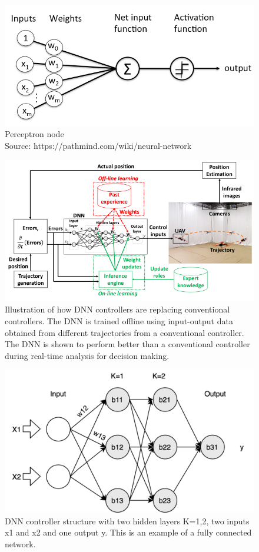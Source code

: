 \begin{figure}
	\centering
	\includegraphics[width=0.7\linewidth]{Images/perceptron_node}
	\caption{Perceptron node  \\ Source: https://pathmind.com/wiki/neural-network}
	\label{fig:perceptronnode}
\end{figure}

\begin{figure}
	\centering
	\includegraphics[width=0.7\linewidth]{Images/DNNcontroller}
	\caption{Illustration of how DNN controllers are replacing conventional controllers. The DNN is trained offline using input-output data obtained from different trajectories from a conventional controller. The DNN is shown to perform better than a conventional controller during real-time analysis for decision making.}
	\label{fig:dnncontroller}
\end{figure}

\begin{figure}
	\centering
	\includegraphics[width=0.7\linewidth]{Images/DNNstructure}
	\caption[DNN structure]{DNN controller structure with two hidden layers K=1,2, two inputs x1 and x2 and one output y. This is an example of a fully connected network.}
	\label{fig:dnn-controller}
\end{figure}



